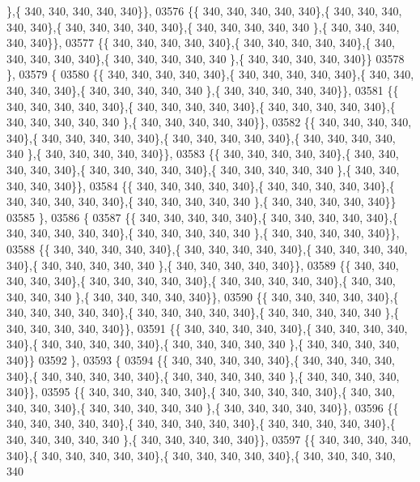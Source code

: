 \begin{DoxyCode}
      \},\{ 340, 340, 340, 340, 340\}\},
03576 \{\{ 340, 340, 340, 340, 340\},\{ 340, 340, 340, 340, 340\},\{ 340, 340, 340, 340, 340\},\{ 340, 340, 340, 340, 340
      \},\{ 340, 340, 340, 340, 340\}\},
03577 \{\{ 340, 340, 340, 340, 340\},\{ 340, 340, 340, 340, 340\},\{ 340, 340, 340, 340, 340\},\{ 340, 340, 340, 340, 340
      \},\{ 340, 340, 340, 340, 340\}\}
03578 \},
03579 \{
03580 \{\{ 340, 340, 340, 340, 340\},\{ 340, 340, 340, 340, 340\},\{ 340, 340, 340, 340, 340\},\{ 340, 340, 340, 340, 340
      \},\{ 340, 340, 340, 340, 340\}\},
03581 \{\{ 340, 340, 340, 340, 340\},\{ 340, 340, 340, 340, 340\},\{ 340, 340, 340, 340, 340\},\{ 340, 340, 340, 340, 340
      \},\{ 340, 340, 340, 340, 340\}\},
03582 \{\{ 340, 340, 340, 340, 340\},\{ 340, 340, 340, 340, 340\},\{ 340, 340, 340, 340, 340\},\{ 340, 340, 340, 340, 340
      \},\{ 340, 340, 340, 340, 340\}\},
03583 \{\{ 340, 340, 340, 340, 340\},\{ 340, 340, 340, 340, 340\},\{ 340, 340, 340, 340, 340\},\{ 340, 340, 340, 340, 340
      \},\{ 340, 340, 340, 340, 340\}\},
03584 \{\{ 340, 340, 340, 340, 340\},\{ 340, 340, 340, 340, 340\},\{ 340, 340, 340, 340, 340\},\{ 340, 340, 340, 340, 340
      \},\{ 340, 340, 340, 340, 340\}\}
03585 \},
03586 \{
03587 \{\{ 340, 340, 340, 340, 340\},\{ 340, 340, 340, 340, 340\},\{ 340, 340, 340, 340, 340\},\{ 340, 340, 340, 340, 340
      \},\{ 340, 340, 340, 340, 340\}\},
03588 \{\{ 340, 340, 340, 340, 340\},\{ 340, 340, 340, 340, 340\},\{ 340, 340, 340, 340, 340\},\{ 340, 340, 340, 340, 340
      \},\{ 340, 340, 340, 340, 340\}\},
03589 \{\{ 340, 340, 340, 340, 340\},\{ 340, 340, 340, 340, 340\},\{ 340, 340, 340, 340, 340\},\{ 340, 340, 340, 340, 340
      \},\{ 340, 340, 340, 340, 340\}\},
03590 \{\{ 340, 340, 340, 340, 340\},\{ 340, 340, 340, 340, 340\},\{ 340, 340, 340, 340, 340\},\{ 340, 340, 340, 340, 340
      \},\{ 340, 340, 340, 340, 340\}\},
03591 \{\{ 340, 340, 340, 340, 340\},\{ 340, 340, 340, 340, 340\},\{ 340, 340, 340, 340, 340\},\{ 340, 340, 340, 340, 340
      \},\{ 340, 340, 340, 340, 340\}\}
03592 \},
03593 \{
03594 \{\{ 340, 340, 340, 340, 340\},\{ 340, 340, 340, 340, 340\},\{ 340, 340, 340, 340, 340\},\{ 340, 340, 340, 340, 340
      \},\{ 340, 340, 340, 340, 340\}\},
03595 \{\{ 340, 340, 340, 340, 340\},\{ 340, 340, 340, 340, 340\},\{ 340, 340, 340, 340, 340\},\{ 340, 340, 340, 340, 340
      \},\{ 340, 340, 340, 340, 340\}\},
03596 \{\{ 340, 340, 340, 340, 340\},\{ 340, 340, 340, 340, 340\},\{ 340, 340, 340, 340, 340\},\{ 340, 340, 340, 340, 340
      \},\{ 340, 340, 340, 340, 340\}\},
03597 \{\{ 340, 340, 340, 340, 340\},\{ 340, 340, 340, 340, 340\},\{ 340, 340, 340, 340, 340\},\{ 340, 340, 340, 340, 340

\end{DoxyCode}
